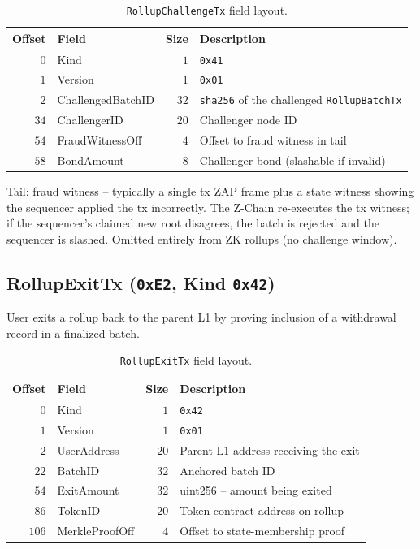 \begin{table}[h]
\centering
\small
\begin{tabular}{@{}rlrp{6cm}@{}}
\toprule
\textbf{Offset} & \textbf{Field} & \textbf{Size} & \textbf{Description} \\
\midrule
$0$ & Kind & $1$ & \texttt{0x41} \\
$1$ & Version & $1$ & \texttt{0x01} \\
$2$ & ChallengedBatchID & $32$ & \texttt{sha256} of the challenged \texttt{RollupBatchTx} \\
$34$ & ChallengerID & $20$ & Challenger node ID \\
$54$ & FraudWitnessOff & $4$ & Offset to fraud witness in tail \\
$58$ & BondAmount & $8$ & Challenger bond (slashable if invalid) \\
\bottomrule
\end{tabular}
\caption{\texttt{RollupChallengeTx} field layout.}
\label{tab:challengetx}
\end{table}

Tail: fraud witness -- typically a single tx ZAP frame plus a state
witness showing the sequencer applied the tx incorrectly. The
Z-Chain re-executes the tx witness; if the sequencer's claimed new
root disagrees, the batch is rejected and the sequencer is slashed.
Omitted entirely from ZK rollups (no challenge window).

\subsection{RollupExitTx (\texttt{0xE2}, Kind \texttt{0x42})}

User exits a rollup back to the parent L1 by proving inclusion of a
withdrawal record in a finalized batch.

\begin{table}[h]
\centering
\small
\begin{tabular}{@{}rlrp{6cm}@{}}
\toprule
\textbf{Offset} & \textbf{Field} & \textbf{Size} & \textbf{Description} \\
\midrule
$0$ & Kind & $1$ & \texttt{0x42} \\
$1$ & Version & $1$ & \texttt{0x01} \\
$2$ & UserAddress & $20$ & Parent L1 address receiving the exit \\
$22$ & BatchID & $32$ & Anchored batch ID \\
$54$ & ExitAmount & $32$ & uint256 -- amount being exited \\
$86$ & TokenID & $20$ & Token contract address on rollup \\
$106$ & MerkleProofOff & $4$ & Offset to state-membership proof \\
\bottomrule
\end{tabular}
\caption{\texttt{RollupExitTx} field layout.}
\label{tab:exittx}
\end{table}

